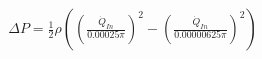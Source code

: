 \documentclass[preview]{standalone}
\begin{document}
\begin{align*}
\Delta  P= \frac{1}{2} \rho ((\frac{\dot{Q}_{In}}{0.00025\pi})^2 - (\frac{\dot{Q}_{In}}{0.00000625\pi})^2)
\end{align*}
\end{document}
